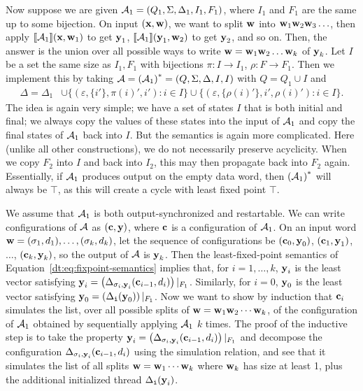 Now suppose we are given $\mathcal{A}_1 = (Q_{1}, \Sigma, \Delta_{1}, I_{1}, F_{1})$, where $I_1$ and $F_1$ are the same up to some bijection. On input $(\textbf{x},\textbf{w})$, we want to split $\textbf{w}$ into $\textbf{w}_1 \textbf{w}_2 \textbf{w}_3 \ldots$, then apply $\llbracket \mathcal{A}_1 \rrbracket(\textbf{x},\textbf{w}_1)$ to get $\textbf{y}_1$, $\llbracket \mathcal{A}_1 \rrbracket(\textbf{y}_1,\textbf{w}_2)$ to get $\textbf{y}_2$, and so on. Then, the answer is the union over all possible ways to write $\textbf{w} = \textbf{w}_1 \textbf{w}_2 \ldots \textbf{w}_k$ of $\textbf{y}_k$. Let $I$ be a set the same size as $I_1, F_1$ with bijections $\pi: I \to I_1$, $\rho: F \to F_1$. Then we implement this by taking $\mathcal{A} = {{(\mathcal{A}_1)}^{*}} = (Q, \Sigma, \Delta, I, I)$ with $Q = Q_1 \cup I$ and
\begin{align*}
\Delta = \Delta_1
    &\cup \big\{(\varepsilon, \{i'\}, \pi(i)', i'): i \in I \big\}
    \cup \big\{(\varepsilon, \{\rho(i)'\}, i', \rho(i)'): i \in I \big\}.
\end{align*}
The idea is again very simple; we have a set of states $I$ that is both initial and final; we always copy the values of these states into the input of $\mathcal{A}_1$ and copy the final states of $\mathcal{A}_1$ back into $I$. But the semantics is again more complicated. Here (unlike all other constructions), we do not necessarily preserve acyclicity. When we copy $F_2$ into $I$ and back into $I_2$, this may then propagate back into $F_2$ again. Essentially, if $\mathcal{A}_1$ produces output on the empty data word, then ${{(\mathcal{A}_1)}^{*}}$ will always be $\top$, as this will create a cycle with least fixed point $\top$.

We assume that $\mathcal{A}_1$ is both output-synchronized and restartable. We can write configurations of $\mathcal{A}$ as $(\textbf{c}, \textbf{y})$, where $\textbf{c}$ is a configuration of $\mathcal{A}_1$.
On an input word $\textbf{w} = (\sigma_1,d_1),\ldots,(\sigma_k,d_k)$, let the sequence of configurations be $(\textbf{c}_0, \textbf{y}_0)$, $(\textbf{c}_1,\textbf{y}_1)$, $\ldots$, $(\textbf{c}_k, \textbf{y}_k)$, so the output of $\mathcal{A}$ is $\textbf{y}_k$.
Then the least-fixed-point semantics of Equation~\eqref{dt:eq:fixpoint-semantics} implies that, for $i=1, \ldots, k$, $\textbf{y}_i$ is the least vector satisfying $\textbf{y}_i = \left(\Delta_{\sigma_i, \textbf{y}_i}(\textbf{c}_{i-1}, d_i)\right)|_{F_1}$. Similarly, for $i = 0$, $\textbf{y}_0$ is the least vector satisfying $\textbf{y}_0 = \left(\Delta_{\texttt{i}}(\textbf{y}_0)\right)|_{F_1}$. Now we want to show by induction that $\textbf{c}_i$ simulates the list, over all possible splits of $\textbf{w} = \textbf{w}_1 \textbf{w}_2 \cdots \textbf{w}_k$, of the configuration of $\mathcal{A}_1$ obtained by sequentially applying $\mathcal{A}_1$ $k$ times. The proof of the inductive step is to take the property $\textbf{y}_i = \left(\Delta_{\sigma_i, \textbf{y}_i}(\textbf{c}_{i-1}, d_i)\right)|_{F_1}$ and decompose the configuration $\Delta_{\sigma_i, \textbf{y}_i}(\textbf{c}_{i-1}, d_i)$ using the simulation relation, and see that it simulates the list of all splits $\textbf{w} = \textbf{w}_1 \cdots \textbf{w}_k$ where $\textbf{w}_k$ has size at least 1, plus the additional initialized thread $\Delta_{\texttt{i}}(\textbf{y}_i)$.

